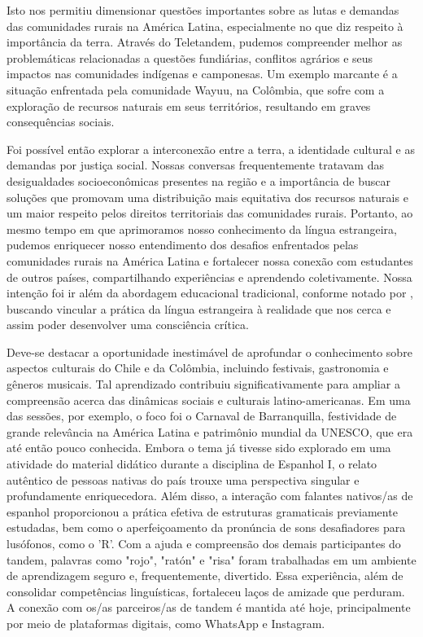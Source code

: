 \documentclass[portuguese]{textolivre}
\begin{document}
Isto nos permitiu dimensionar questões importantes sobre as lutas e demandas das comunidades rurais na América Latina, especialmente no que diz respeito à importância da terra. Através do Teletandem, pudemos compreender melhor as problemáticas relacionadas a questões fundiárias, conflitos agrários e seus impactos nas comunidades indígenas e camponesas. Um exemplo marcante é a situação enfrentada pela comunidade Wayuu, na Colômbia, que sofre com a exploração de recursos naturais em seus territórios, resultando em graves consequências sociais. 

Foi possível então explorar a interconexão entre a terra, a identidade cultural e as demandas por justiça social. Nossas conversas frequentemente tratavam das desigualdades socioeconômicas presentes na região e a importância de buscar soluções que promovam uma distribuição mais equitativa dos recursos naturais e um maior respeito pelos direitos territoriais das comunidades rurais. Portanto, ao mesmo tempo em que aprimoramos nosso conhecimento da língua estrangeira, pudemos enriquecer nosso entendimento dos desafios enfrentados pelas comunidades rurais na América Latina e fortalecer nossa conexão com estudantes de outros países, compartilhando experiências e aprendendo coletivamente. Nossa intenção foi ir além da abordagem educacional tradicional, conforme notado por \textcite{freire_pedagogia_1981}, buscando vincular a prática da língua estrangeira à realidade que nos cerca e assim poder desenvolver uma consciência crítica.

Deve-se destacar a oportunidade inestimável de aprofundar o conhecimento sobre aspectos culturais do Chile e da Colômbia, incluindo festivais, gastronomia e gêneros musicais. Tal aprendizado contribuiu significativamente para ampliar a compreensão acerca das dinâmicas sociais e culturais latino-americanas. Em uma das sessões, por exemplo, o foco foi o Carnaval de Barranquilla, festividade de grande relevância na América Latina e patrimônio mundial da UNESCO, que era até então pouco conhecida. Embora o tema já tivesse sido explorado em uma atividade do material didático durante a disciplina de Espanhol I, o relato autêntico de pessoas nativas do país trouxe uma perspectiva singular e profundamente enriquecedora. Além disso, a interação com falantes nativos/as de espanhol proporcionou a prática efetiva de estruturas gramaticais previamente estudadas, bem como o aperfeiçoamento da pronúncia de sons desafiadores para lusófonos, como o 'R'. Com a ajuda e compreensão dos demais participantes do tandem, palavras como "rojo", "ratón" e "risa" foram trabalhadas em um ambiente de aprendizagem seguro e, frequentemente, divertido. Essa experiência, além de consolidar competências linguísticas, fortaleceu laços de amizade que perduram. A conexão com os/as parceiros/as de tandem é mantida até hoje, principalmente por meio de plataformas digitais, como WhatsApp e Instagram.
\end{document}
